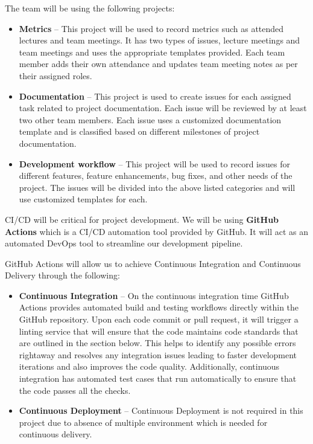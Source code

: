 \documentclass{article}
\begin{document}
The team will be using the following projects:

\begin{itemize}
\item \textbf{Metrics} -- This project will be used to record metrics such as attended lectures and team meetings. It has two types of issues, lecture meetings and team meetings and uses the appropriate templates provided. Each team member adds their own attendance and updates team meeting notes as per their assigned roles.
\item \textbf{Documentation} -- This project is used to create issues for each assigned task related to project documentation. Each issue will be reviewed by at least two other team members. Each issue uses a customized documentation template and is classified based on different milestones of project documentation. 
\item \textbf{Development workflow} -- This project will be used to record issues for different features, feature enhancements, bug fixes, and other needs of the project. The issues will be divided into the above listed categories and will use customized templates for each. 
\end{itemize}

CI/CD will be critical for project development. We will be using \textbf{GitHub Actions} which is a CI/CD automation tool provided by GitHub. It will act as an automated DevOps tool to streamline our development pipeline.

GitHub Actions will allow us to achieve Continuous Integration and Continuous Delivery through the following:
\begin{itemize}
  \item \textbf{Continuous Integration} -- On the continuous integration time GitHub Actions provides automated build and testing workflows directly within the GitHub repository. Upon each code commit or pull request, it will trigger a linting service that will ensure that the code maintains code standards that are outlined in the section below. This helps to identify any possible errors rightaway and resolves any integration issues leading to faster development iterations and also improves the code quality. Additionally, continuous integration has automated test cases that run automatically to ensure that the code passes all the checks.
  \item \textbf{Continuous Deployment} -- Continuous Deployment is not required in this project due to absence of multiple environment which is needed for continuous delivery.
\end{itemize}
\end{document}

